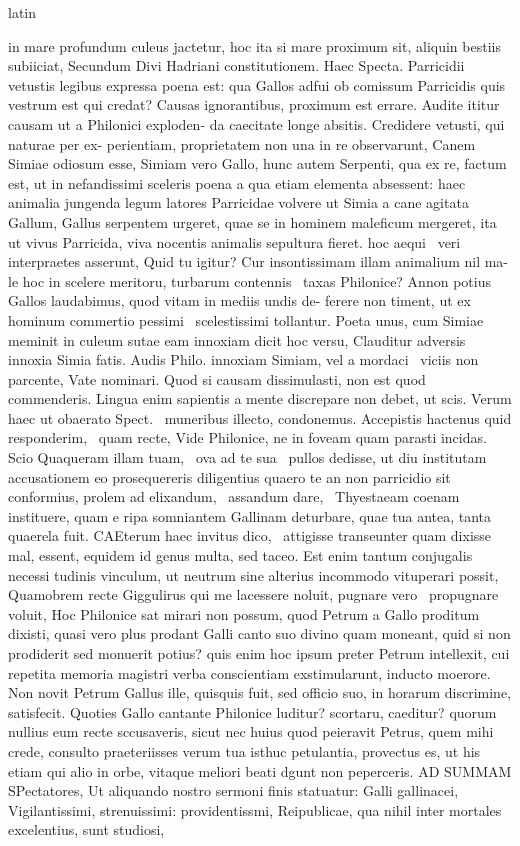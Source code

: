 \documentclass[12pt]{book}
\renewenvironment{latin}
    	{\begin{hyphenrules}{latin}}
    	{\end{hyphenrules}}
\begin{document}
\begin{pages}
\begin{latin}
\begin{Leftside}
in mare profundum culeus jactetur, hoc ita si mare proximum sit, aliquin bestiis subiiciat, Secundum Divi Hadriani constitutionem. Haec Specta. Parricidii vetustis legibus expressa poena est: qua Gallos adfui ob comissum Parricidis quis vestrum est qui credat? Causas ignorantibus, proximum est errare. Audite ititur causam ut a Philonici exploden- da caecitate longe absitis. Credidere vetusti, qui naturae per ex- perientiam, proprietatem non una in re observarunt, Canem Simiae odiosum esse, Simiam vero Gallo, hunc autem Serpenti, qua ex re, factum est, ut in nefandissimi sceleris poena a qua etiam elementa absessent: haec animalia jungenda legum latores Parricidae volvere ut Simia a cane agitata Gallum, Gallus serpentem urgeret, quae se in hominem maleficum mergeret, ita ut vivus Parricida, viva nocentis animalis sepultura fieret. hoc aequi ﻿\ampersand\ veri interpraetes asserunt, Quid tu igitur? Cur insontissimam illam animalium nil ma- le hoc in scelere meritoru, turbarum contennis ﻿\ampersand\ taxas Philonice? Annon potius Gallos laudabimus, quod vitam in mediis undis de-   ferere non timent, ut ex hominum commertio pessimi ﻿\ampersand\ scelestissimi tollantur. Poeta unus, cum Simiae meminit in culeum sutae eam innoxiam dicit hoc versu, Clauditur adversis innoxia Simia fatis. Audis Philo. innoxiam Simiam, vel a mordaci ﻿\ampersand\ viciis non parcente, Vate nominari. Quod si causam dissimulasti, non est quod commenderis. Lingua enim sapientis a mente discrepare non debet, ut scis. Verum haec ut obaerato Spect. ﻿\ampersand\ muneribus illecto, condonemus. Accepistis hactenus quid responderim, ﻿\ampersand\ quam recte, Vide Philonice, ne in foveam quam parasti incidas. Scio Quaqueram illam tuam, ﻿\ampersand\ ova ad te sua ﻿\ampersand\ pullos dedisse, ut diu institutam accusationem eo prosequereris diligentius quaero te an non parricidio sit conformius, prolem ad elixandum, ﻿\ampersand\ assandum dare, ﻿\ampersand\ Thyestaeam coenam instituere, quam e ripa somniantem Gallinam deturbare, quae tua antea, tanta quaerela fuit. CAEterum haec invitus dico, ﻿\ampersand\ attigisse transeunter quam dixisse mal, essent, equidem id genus multa, sed taceo. Est enim tantum conjugalis necessi tudinis vinculum, ut neutrum sine alterius incommodo vituperari possit, Quamobrem recte Giggulirus qui me lacessere noluit, pugnare vero ﻿\ampersand\ propugnare voluit, Hoc Philonice sat mirari non possum, quod Petrum a Gallo proditum dixisti, quasi vero plus prodant Galli canto suo divino quam moneant, quid si non prodiderit sed monuerit potius? quis enim hoc ipsum preter Petrum intellexit, cui repetita memoria magistri verba conscientiam exstimularunt, inducto moerore. Non novit Petrum Gallus ille, quisquis fuit, sed officio suo, in horarum discrimine, satisfecit. Quoties Gallo cantante Philonice luditur? scortaru, caeditur? quorum nullius eum recte sccusaveris, sicut nec huius quod peieravit Petrus, quem mihi crede, consulto praeteriisses verum tua isthuc petulantia, provectus es, ut his etiam qui alio in orbe, vitaque meliori beati dgunt non peperceris. AD SUMMAM SPectatores,   Ut aliquando nostro sermoni finis statuatur: Galli gallinacei, Vigilantissimi, strenuissimi: providentissmi, Reipublicae, qua nihil inter mortales excelentius, sunt studiosi, 
\end{Leftside}
\end{latin}
\end{pages}
\end{document}
